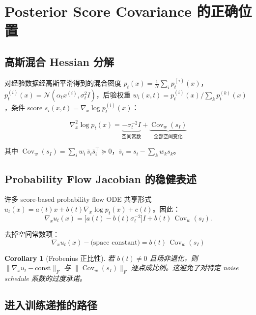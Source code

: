 \documentclass[11pt,a4paper]{article}
\newtheorem{corollary}[theorem]{Corollary}
\DeclareMathOperator{\Cov}{Cov}
\newcommand{\cN}{\mathcal{N}}
\begin{document}
\section{Posterior Score Covariance 的正确位置}
\label{sec:psc}

\subsection{高斯混合 Hessian 分解}

对经验数据经高斯平滑得到的混合密度 $p_t(x) = \frac{1}{N}\sum_i p_t^{(i)}(x)$，$p_t^{(i)}(x) = \cN(\alpha_t x^{(i)}, \sigma_t^2 I)$，后验权重 $w_i(x,t) = p_t^{(i)}(x)/\sum_k p_t^{(k)}(x)$，条件 score $s_i(x,t) = \nabla_x\log p_t^{(i)}(x)$：

\begin{equation}\label{eq:hessian_decomp}
\boxed{
\nabla_x^2\log p_t(x) = \underbrace{-\sigma_t^{-2}I}_{\text{空间常数}} + \underbrace{\Cov_w(s_I)}_{\text{全部空间变化}}
}
\end{equation}

其中 $\Cov_w(s_I) = \sum_i w_i\,\bar{s}_i\bar{s}_i^\top \succeq 0$，$\bar{s}_i = s_i - \sum_k w_k s_k$。

\subsection{Probability Flow Jacobian 的稳健表述}

许多 score-based probability flow ODE 共享形式 $u_t(x) = a(t)x + b(t)\nabla_x\log p_t(x) + c(t)$。因此：
\begin{equation}\label{eq:jacobian_general}
\nabla_x u_t(x) = \bigl[a(t) - b(t)\sigma_t^{-2}\bigr]I + b(t)\,\Cov_w(s_I).
\end{equation}

去掉空间常数项：
\begin{equation}\label{eq:jacobian_cov}
\boxed{
\nabla_x u_t(x) - \text{(space constant)} = b(t)\,\Cov_w(s_I)
}
\end{equation}

\begin{corollary}[Frobenius 正比性]
若 $b(t) \neq 0$ 且场非退化，则 $\|\nabla_x u_t - \text{const}\|_F$ 与 $\|\Cov_w(s_I)\|_F$ 逐点成比例。这避免了对特定 noise schedule 系数的过度承诺。
\end{corollary}

\subsection{进入训练递推的路径}
\end{document}
